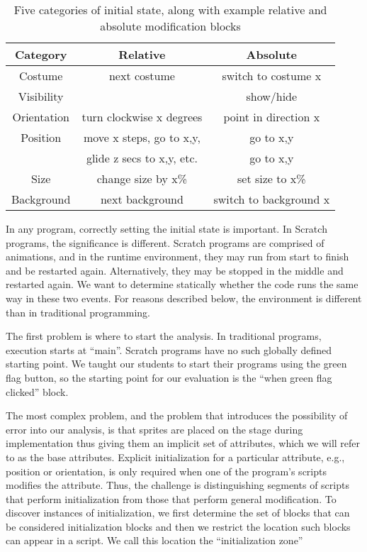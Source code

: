 \begin{table}
\centering
\begin{tabular}{|c|c|c|} \hline
Category & Relative&Absolute\\ \hline \hline
Costume& next costume & switch to costume x\\ \hline
Visibility& & show/hide\\ \hline
Orientation&turn clockwise x degrees&point in direction x\\ \hline
Position&move x steps, go to x,y,&go to x,y\\
&glide z secs to x,y, etc.&go to x,y\\ \hline
Size&change size by x\% & set size to x\%\\ \hline
Background&next background & switch to background x\\ \hline
\end{tabular}
\caption{Five categories of initial state, along with example relative and
  absolute modification blocks}
\end{table}


In any program, correctly setting the initial state is important.  In Scratch
programs, the significance is different.  Scratch programs are comprised of
animations, and in the runtime environment, they may run from start to finish
and be restarted again.  Alternatively, they may be stopped in the middle and
restarted again.  We want to determine statically whether the code runs the
same way in these two events.  For reasons described below, the environment is
different than in traditional programming.

The first problem is where to start the analysis.  In traditional programs,
execution starts at ``main''.  Scratch programs have no such globally defined
starting point.  We taught our students to start their programs using the green
flag button, so the starting point for our evaluation is the ``when green flag
clicked'' block.

The most complex problem, and the problem that introduces the possibility of
error into our analysis, is that sprites are placed on the stage during
implementation thus giving them an implicit set of attributes, which we will
refer to as the base attributes. Explicit initialization for a particular
attribute, e.g., position or orientation, is only required when one of the
program's scripts modifies the attribute. Thus, the challenge is distinguishing
segments of scripts that perform initialization from those that perform general
modification. To discover instances of initialization, we first determine the
set of blocks that can be considered initialization blocks and then we restrict
the location such blocks can appear in a script. We call this location the
``initialization zone''

